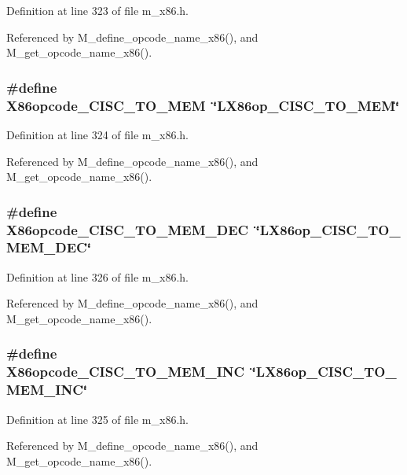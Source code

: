 Definition at line 323 of file m\_\-x86.h.

Referenced by M\_\-define\_\-opcode\_\-name\_\-x86(), and M\_\-get\_\-opcode\_\-name\_\-x86().
\subsubsection{\setlength{\rightskip}{0pt plus 5cm}\#define X86opcode\_\-CISC\_\-TO\_\-MEM~\char`\"{}LX86op\_\-CISC\_\-TO\_\-MEM\char`\"{}}\label{m__x86_8h_a43a32d48eb5c5eedb17a13d829b9271}




Definition at line 324 of file m\_\-x86.h.

Referenced by M\_\-define\_\-opcode\_\-name\_\-x86(), and M\_\-get\_\-opcode\_\-name\_\-x86().
\subsubsection{\setlength{\rightskip}{0pt plus 5cm}\#define X86opcode\_\-CISC\_\-TO\_\-MEM\_\-DEC~\char`\"{}LX86op\_\-CISC\_\-TO\_\-MEM\_\-DEC\char`\"{}}\label{m__x86_8h_c940d5276d5ac81a4ffeb08fba36a475}




Definition at line 326 of file m\_\-x86.h.

Referenced by M\_\-define\_\-opcode\_\-name\_\-x86(), and M\_\-get\_\-opcode\_\-name\_\-x86().
\subsubsection{\setlength{\rightskip}{0pt plus 5cm}\#define X86opcode\_\-CISC\_\-TO\_\-MEM\_\-INC~\char`\"{}LX86op\_\-CISC\_\-TO\_\-MEM\_\-INC\char`\"{}}\label{m__x86_8h_98d9ccc193cf58c2d2edd48c1be8a36e}




Definition at line 325 of file m\_\-x86.h.

Referenced by M\_\-define\_\-opcode\_\-name\_\-x86(), and M\_\-get\_\-opcode\_\-name\_\-x86().
